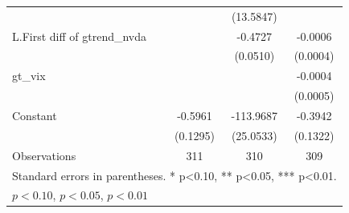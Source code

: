 \begin{table}[htbp]
\begin{tabular}{l*{3}{c}}
                    &                     &   (13.5847)         &                     \\
\addlinespace
L.First diff of gtrend\_nvda&                     &     -0.4727\sym{***}&     -0.0006         \\
                    &                     &    (0.0510)         &    (0.0004)         \\
\addlinespace
gt\_vix              &                     &                     &     -0.0004         \\
                    &                     &                     &    (0.0005)         \\
\addlinespace
Constant            &     -0.5961\sym{***}&   -113.9687\sym{***}&     -0.3942\sym{***}\\
                    &    (0.1295)         &   (25.0533)         &    (0.1322)         \\
\midrule
Observations        &         311         &         310         &         309         \\
\bottomrule
\multicolumn{4}{l}{\footnotesize Standard errors in parentheses. * p<0.10, ** p<0.05, *** p<0.01.}\\
\multicolumn{4}{l}{\footnotesize \sym{*} \(p<0.10\), \sym{**} \(p<0.05\), \sym{***} \(p<0.01\)}\\
\end{tabular}
\end{table}
